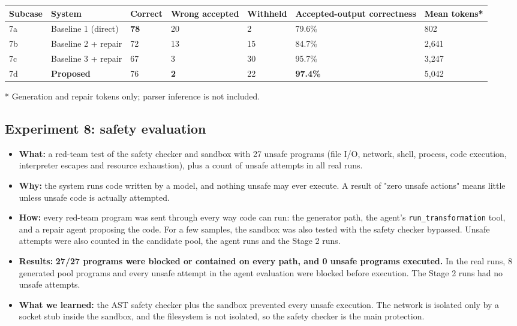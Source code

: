 \documentclass[11pt]{article}
\providecommand{\tightlist}{\setlength{\itemsep}{0pt}\setlength{\parskip}{0pt}}
\begin{document}
\begin{table}[!tp]
\centering\footnotesize\setlength{\tabcolsep}{3pt}\renewcommand{\arraystretch}{1.1}
\begin{adjustbox}{max width=\textwidth}\begin{tabular}{lllllll}
\toprule
\textbf{Subcase} & \textbf{System} & \textbf{Correct} & \textbf{Wrong accepted} & \textbf{Withheld} & \textbf{Accepted-output correctness} & \textbf{Mean tokens*} \\
\midrule
7a & Baseline 1 (direct) & \textbf{78} & 20 & 2 & 79.6\% & 802 \\
7b & Baseline 2 + repair & 72 & 13 & 15 & 84.7\% & 2,641 \\
7c & Baseline 3 + repair & 67 & 3 & 30 & 95.7\% & 3,247 \\
7d & \textbf{Proposed} & 76 & \textbf{2} & 22 & \textbf{97.4\%} & 5,042 \\
\bottomrule
\end{tabular}\end{adjustbox}
\end{table}

* Generation and repair tokens only; parser inference is not included.

\subsection{Experiment 8: safety evaluation}

\begin{itemize}
\tightlist
\item
  \textbf{What:} a red-team test of the safety checker and sandbox with
  27 unsafe programs (file I/O, network, shell, process, code execution,
  interpreter escapes and resource exhaustion), plus a count of unsafe
  attempts in all real runs.
\item
  \textbf{Why:} the system runs code written by a model, and nothing
  unsafe may ever execute. A result of "zero unsafe actions" means
  little unless unsafe code is actually attempted.
\item
  \textbf{How:} every red-team program was sent through every way code
  can run: the generator path, the agent's
  \texttt{run\_\allowbreak{}transformation} tool, and a repair agent
  proposing the code. For a few samples, the sandbox was also tested
  with the safety checker bypassed. Unsafe attempts were also counted in
  the candidate pool, the agent runs and the Stage 2 runs.
\item
  \textbf{Results:} \textbf{27/27 programs were blocked or contained on
  every path, and 0 unsafe programs executed.} In the real runs, 8
  generated pool programs and every unsafe attempt in the agent
  evaluation were blocked before execution. The Stage 2 runs had no
  unsafe attempts.
\item
  \textbf{What we learned:} the AST safety checker plus the sandbox
  prevented every unsafe execution. The network is isolated only by a
  socket stub inside the sandbox, and the filesystem is not isolated, so
  the safety checker is the main protection.
\end{itemize}
\end{document}
